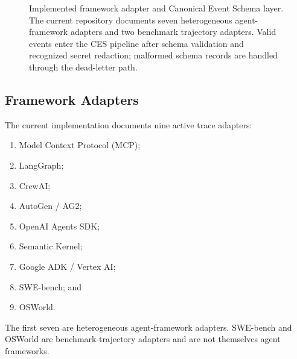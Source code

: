 \documentclass[11pt,a4paper]{article}
\begin{document}
\begin{figure}[!htbp]

\caption{Implemented framework adapter and Canonical Event Schema layer. The current
repository documents seven heterogeneous agent-framework adapters and two benchmark
trajectory adapters. Valid events enter the CES pipeline after schema validation and
recognized secret redaction; malformed schema records are handled through the
dead-letter path.}
\label{fig:ces}

\end{figure}

\subsection{Framework Adapters}

The current implementation documents nine active trace adapters:

\begin{enumerate}
\item Model Context Protocol (MCP);
\item LangGraph;
\item CrewAI;
\item AutoGen / AG2;
\item OpenAI Agents SDK;
\item Semantic Kernel;
\item Google ADK / Vertex AI;
\item SWE-bench; and
\item OSWorld.
\end{enumerate}

The first seven are heterogeneous agent-\allowbreak framework adapters.
SWE-\allowbreak bench and OSWorld are benchmark-\allowbreak trajectory adapters
and are not themselves agent frameworks.
\end{document}
